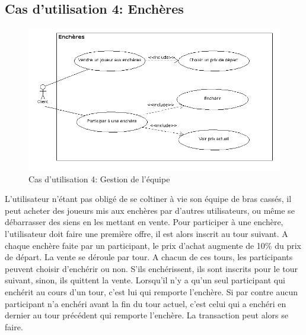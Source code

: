 \documentclass[a4paper,titlepage]{scrreprt}
\begin{document}
  \subsection{Cas d'utilisation 4: Enchères}
  \begin{figure}[H]
    \center
    \includegraphics[scale=0.5]{uml/useCaseView/Encheres.png}
    \caption{Cas d'utilisation 4: Gestion de l'équipe}
  \end{figure}  
    L'utilisateur n'étant pas obligé de se coltiner à vie son équipe de bras cassés, il peut acheter des joueurs mis aux enchères par d'autres utilisateurs, ou même se débarrasser des siens en les mettant en vente. Pour participer à une enchère, l'utilisateur doit faire une première offre, il est alors inscrit au tour suivant. A chaque enchère faite par un participant, le prix d'achat augmente de 10\% du prix de départ. La vente se déroule par tour. A chacun de ces tours, les participants peuvent choisir d'enchérir ou non. S'ils enchérissent, ils sont inscrits pour le tour suivant, sinon, ils quittent la vente. Lorsqu'il n'y a qu'un seul participant qui enchérit au cours d'un tour, c'est lui qui remporte l'enchère. Si par contre aucun participant n'a enchéri avant la fin du tour actuel, c'est celui qui a enchéri en dernier au tour précédent qui remporte l'enchère. La transaction peut alors se faire. 
\end{document}
